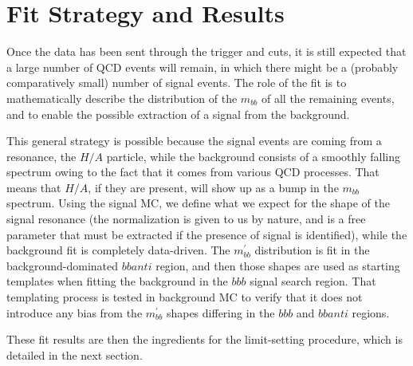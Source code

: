  

\chapter[Fit Strategy and Results]{Fit Strategy and Results}


Once the data has been sent through the trigger and cuts, it is still expected
that a large number of QCD events will remain, in which there might be a (probably comparatively small)
number of signal events.  The role of the fit is to mathematically describe
the distribution of the $m_{bb}$ of all the remaining events, and to enable the
possible extraction of a signal from the background.  

This general strategy is possible because the signal events are coming from a 
resonance, the $H/A$ particle, while the background consists of a smoothly 
falling spectrum owing to the fact that it comes from various QCD processes.
That means that $H/A$, if they are present, will show up as a bump in the $m_{bb}$
spectrum.  Using the signal MC, we define what we expect for the shape of
the signal resonance (the normalization is given to us by nature, and 
is a free parameter that must be extracted if the presence of signal is identified),
while the background fit is completely data-driven. The $m_{bb}^{'}$ distribution 
is fit in the background-dominated $bbanti$ region, and then those shapes 
are used as starting templates when fitting the background in the $bbb$ signal 
search region.  That templating process is tested in background MC to verify
that it does not introduce any bias from the $m_{bb}^{'}$ shapes differing
in the $bbb$ and $bbanti$ regions.
    
    

These fit results are then
the ingredients for the limit-setting procedure, which is detailed in the next section.

